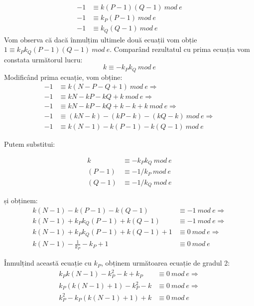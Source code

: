 \documentclass[12]{report}
\begin{document}
\begin{equation}
\begin{split}
-1 &\equiv k(P-1)(Q-1) \ mod \ e \\
-1 &\equiv k_P(P-1) \ mod \ e \\
-1 &\equiv k_Q(Q-1) \ mod \ e
\end{split}
\end{equation}
Vom observa că dacă înmulțim ultimele două ecuații vom obție $ 1 \equiv k_Pk_Q(P-1)(Q-1) \ mod \ e$. Comparând rezultatul cu prima ecuația vom constata următorul lucru:
$$ k \equiv -k_Pk_Q \ mod \ e $$
Modificând prima ecuație, vom obține:
\begin{align*}
 -1 &\equiv k(N-P-Q+1) \ mod \ e \Rightarrow \\
 -1 &\equiv kN - kP - kQ +k \ mod \ e \Rightarrow \\
 -1 &\equiv kN-kP-kQ + k - k + k \ mod \ e \Rightarrow \\
 -1 &\equiv (kN-k) - (kP - k ) - (kQ - k ) \ mod \ e \Rightarrow \\
 -1 &\equiv k(N-1) -k(P-1) - k(Q-1) \ mod \ e 
\end{align*}


Putem substitui:

\begin{align*}
k &\equiv -k_P k_Q \ mod \ e \\
(P-1) &\equiv -1/k_P \ mod \ e \\
(Q-1) &\equiv -1/k_Q \ mod \ e
\end{align*}

și obținem:
\begin{align*}
k(N-1) - k(P-1) - k(Q-1)  &\equiv -1  \ mod \ e \Rightarrow \\ 
k(N-1) + k_Pk_Q(P-1) + k(Q-1)  &\equiv -1  \ mod \ e \Rightarrow  \\
 k(N-1) + k_Pk_Q(P-1) + k(Q-1) +1 &\equiv 0 \ mod \ e \Rightarrow \\
 k(N-1) - \frac{1}{k_P} - k_P + 1 &\equiv 0 \ mod \ e
\end{align*}


Înmulțind această ecuație cu $k_P$, obținem următoarea ecuație de gradul 2:
\begin{align*}
 k_P k (N-1) - k_{P}^{2} - k + k_P &\equiv 0 \ mod \ e \Rightarrow \\
 k_P(k(N-1)+1) - k_{P}^{2} - k &\equiv 0 \ mod \ e \Rightarrow  \\
 k_{P}^{2} - k_P(k(N-1)+1) + k &\equiv 0 \ mod \ e 
\end{align*}
\end{document}
